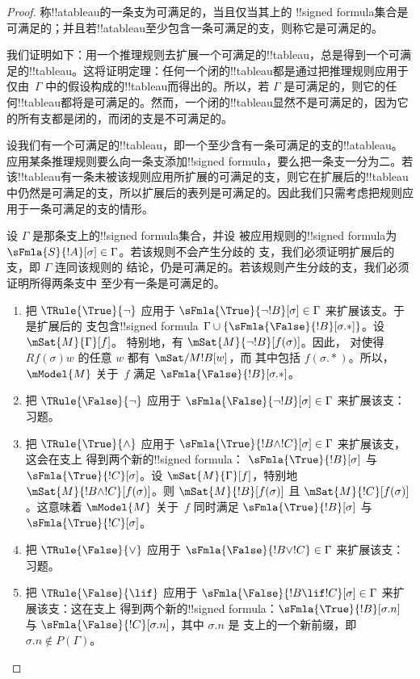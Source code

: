 \documentclass[../../../include/open-logic-section]{subfiles}
\begin{document}
\begin{proof}
称!!a{tableau}的一条支为可满足的，当且仅当其上的
!!{signed formula}集合是可满足的；并且若!!a{tableau}至少包含一条可满足的支，则称它是可满足的。

我们证明如下：用一个推理规则去扩展一个可满足的!!{tableau}，总是得到一个可满足的!!{tableau}。这将证明定理：任何一个闭的!!{tableau}都是通过把推理规则应用于仅由~$\Gamma$ 中的假设构成的!!{tableau}而得出的。所以，若 $\Gamma$ 是可满足的，则它的任何!!{tableau}都将是可满足的。然而，一个闭的!!{tableau}显然不是可满足的，因为它的所有支都是闭的，而闭的支是不可满足的。

设我们有一个可满足的!!{tableau}，即一个至少含有一条可满足的支的!!a{tableau}。应用某条推理规则要么向一条支添加!!{signed formula}，要么把一条支一分为二。若该!!{tableau}有一条未被该规则应用所扩展的可满足的支，则它在扩展后的!!{tableau}中仍然是可满足的支，所以扩展后的表列是可满足的。因此我们只需考虑把规则应用于一条可满足的支的情形。

设 $\Gamma$ 是那条支上的!!{signed formula}集合，并设
被应用规则的!!{signed formula}为 $\sFmla{S}{!A}[\sigma] \in \Gamma$。若该规则不会产生分歧的
支，我们必须证明扩展后的支，即 $\Gamma$ 连同该规则的
结论，仍是可满足的。若该规则产生分歧的支，我们必须证明所得两条支中
至少有一条是可满足的。
\begin{enumerate}
\item 把 $\TRule{\True}{\lnot}$ 应用于
  $\sFmla{\True}{\lnot !B}[\sigma] \in \Gamma$ 来扩展该支。于是扩展后的
  支包含!!{signed formula} $\Gamma \cup
  \{\sFmla{\False}{!B}[\sigma.{*}]\}$。设 $\mSat{M}{\Gamma}[f]$。
  特别地，有 $\mSat{M}{\lnot !B}[f(\sigma)]$。因此，
  对使得 $Rf(\sigma)w$ 的任意 $w$ 都有 $\mSat/{M}{!B}[w]$，而
  其中包括 $f(\sigma.{*})$。所以，$\mModel{M}$ 关于~$f$ 满足
  $\sFmla{\False}{!B}[\sigma.{*}]$。
\item 把 $\TRule{\False}{\lnot}$ 应用于
  $\sFmla{\False}{\lnot !B}[\sigma] \in \Gamma$ 来扩展该支：习题。
\item 把 $\TRule{\True}{\land}$ 应用于
  $\sFmla{\True}{!B \land !C}[\sigma] \in \Gamma$ 来扩展该支，这会在支上
  得到两个新的!!{signed formula}：
  $\sFmla{\True}{!B}[\sigma]$ 与 $\sFmla{\True}{!C}[\sigma]$。设
  $\mSat{M}{\Gamma}[f]$，特别地 $\mSat{M}{!B \land
    !C}[f(\sigma)]$。则 $\mSat{M}{!B}[f(\sigma)]$ 且
  $\mSat{M}{!C}[f(\sigma)]$。这意味着 $\mModel{M}$ 关于~$f$ 同时满足
  $\sFmla{\True}{!B}[\sigma]$ 与 $\sFmla{\True}{!C}[\sigma]$。
\item 把 $\TRule{\False}{\lor}$ 应用于
  $\sFmla{\False}{!B \lor !C} \in \Gamma$ 来扩展该支：习题。
\item 把 $\TRule{\False}{\lif}$ 应用于
  $\sFmla{\False}{!B \lif !C}[\sigma] \in \Gamma$ 来扩展该支：这在支上
  得到两个新的!!{signed formula}：$\sFmla{\True}{!B}[\sigma.n]$ 与
  $\sFmla{\False}{!C}[\sigma.n]$，其中 $\sigma.n$ 是
  支上的一个新前缀，即 $\sigma.n \notin P(\Gamma)$。


\end{enumerate}
\end{proof}
\end{document}
